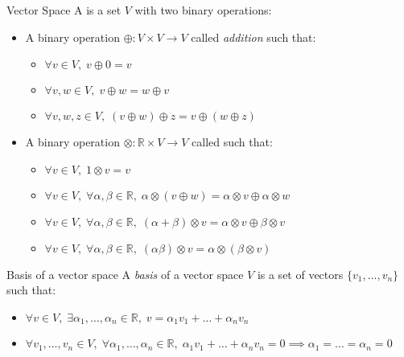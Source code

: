 \begin{definition}{Vector Space}{}
    A  is a set $V$ with two binary operations:
    \begin{itemize}
        \item A binary operation $\oplus : V \times V \to V$ called \emph{addition}
            such that:
            \begin{itemize}
                \item $\forall v \in V,\; v \oplus 0 = v$
                \item $\forall v,w \in V,\; v \oplus w = w \oplus v$
                \item $\forall v,w,z \in V,\; (v \oplus w) \oplus z = v \oplus (w \oplus z)$
            \end{itemize}
        \item A binary operation $\otimes : \mathbb{R} \times V \to V$ called
             such that:
            \begin{itemize}
                \item $\forall v \in V,\; 1 \otimes v = v$
                \item $\forall v \in V,\; \forall \alpha,\beta \in \mathbb{R},\;
                    \alpha \otimes (v \oplus w) = \alpha \otimes v \oplus \alpha \otimes w$
                \item $\forall v \in V,\; \forall \alpha,\beta \in \mathbb{R},\;
                    (\alpha + \beta) \otimes v = \alpha \otimes v \oplus \beta \otimes v$
                \item $\forall v \in V,\; \forall \alpha,\beta \in \mathbb{R},\;
                    (\alpha \beta) \otimes v = \alpha \otimes (\beta \otimes v)$
            \end{itemize}
    \end{itemize}
\end{definition}

\begin{definition}{Basis of a vector space}{}
    A \emph{basis} of a vector space $V$ is a set of vectors $\{v_1,\ldots,v_n\}$
    such that:
    \begin{itemize}
        \item $\forall v \in V,\; \exists \alpha_1,\ldots,\alpha_n \in \mathbb{R},\;
            v = \alpha_1 v_1 + \ldots + \alpha_n v_n$
        \item $\forall v_1,\ldots,v_n \in V,\; \forall \alpha_1,\ldots,\alpha_n \in \mathbb{R},\;
            \alpha_1 v_1 + \ldots + \alpha_n v_n = 0 \implies \alpha_1 = \ldots = \alpha_n = 0$
    \end{itemize}
\end{definition}

